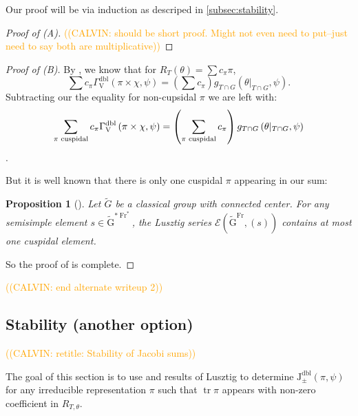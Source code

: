 \documentclass[12pt, reqno]{amsart}
\newtheorem{proposition}[theorem]{Proposition}
\theoremstyle{definition}
\theoremstyle{definition}
\theoremstyle{definition}
\newcommand{\hermitianSpace}{\mathrm{V}}
\newcommand{\fieldCharacter}{\psi}
\newcommand{\trace}{\operatorname{tr}}
\newcommand{\GroupExtension}[1]{\widetilde{#1}}
\newcommand{\Frobenius}{\operatorname{Fr}}
\newcommand{\dblJacobiSumScalar}[2]{\mathrm{J}_{\pm}^{\mathrm{dbl}}\left(#1, #2\right)}
\newcommand{\dblGammaFactorSpace}[4]{\Gamma^{\mathrm{dbl}}_{#1}\left(#2 \times #3, #4\right)}
\newcommand{\algebraicGroup}[1]{\boldsymbol{\mathrm{#1}}}
\newcommand{\LusztigSeries}[2]{\mathcal{E}\left(#1, (#2)\right)}
\newcommand{\DualFrobeniusFixedPoints}[2][\Frobenius^{\ast}]{\algebraicGroup{#2}^{\ast #1}}
\newcommand{\FrobeniusFixedPoints}[2][\Frobenius]{\algebraicGroup{#2}^{#1}}
\newcommand{\calvin}[1]{\textcolor{orange}{\sffamily ((CALVIN: #1))}}
\begin{document}
Our proof will be via induction as descriped in \ref{subsec:stability}.
\begin{proof}[Proof of (A)]
\calvin{should be short proof. Might not even need to put--just need to say both are multiplicative}
\end{proof}
\begin{proof}[Proof of (B)]

By , we know that for $R_T(\theta) = \sum c_{\pi} \pi$, 
$$\sum c_{\pi} \dblGammaFactorSpace{\hermitianSpace}{\pi}{\chi}{\fieldCharacter} = (\sum c_{\pi})g_{T \cap G}\left(\theta|_{T \cap G}, \fieldCharacter\right).$$Subtracting our the equality for non-cupsidal $\pi$ we are left with:
$$ \sum_{\pi \textnormal{ cuspidal}} c_{\pi} \dblGammaFactorSpace{\hermitianSpace}{\pi}{\chi}{\fieldCharacter} = \left(\sum_{\pi \textnormal{ cuspidal}} c_{\pi}\right)g_{T \cap G}\left(\theta|_{T \cap G}, \fieldCharacter\right)$$.

But it is well known that there is only one cuspidal $\pi$ appearing in our sum:
\begin{proposition}[{\cite[Page 172]{Lusztig1977}}]
	Let $\GroupExtension{G}$ be a classical group with connected center. For any semisimple element $s \in \DualFrobeniusFixedPoints{\GroupExtension{G}}$, the Lusztig series $\LusztigSeries{\FrobeniusFixedPoints{\GroupExtension{G}}}{s}$ contains at most one cuspidal element.
\end{proposition}

So the proof of  is complete.
\end{proof}
\calvin{end alternate writeup 2}

\subsection{Stability (another option)}
\calvin{retitle: Stability of Jacobi sums}

The goal of this section is to use  and results of Lusztig to determine $\dblJacobiSumScalar{\pi}{\fieldCharacter}$ for any irreducible representation $\pi$ such that $\trace \pi$ appears with non-zero coefficient in $R_{T,\theta}$.
\end{document}
